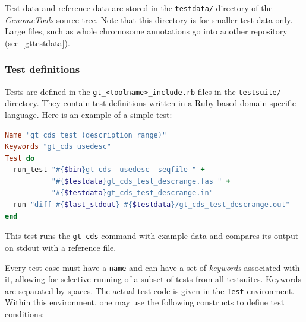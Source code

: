 \documentclass[11pt,final]{article}
\newcommand{\keyword}[1]{\lstinline{#1}}
\newcommand{\Gt}[0]{\emph{GenomeTools}\xspace}
\begin{document}
Test data and reference data are stored in the \keyword{testdata/} directory
of the \Gt source tree. Note that this directory is for smaller test data only.
Large files, such as whole chromosome annotations go into another repository
(see~\ref{gttestdata}).

\subsubsection{Test definitions}
\label{testdefinitions}

Tests are defined in the \keyword{gt_<toolname>_include.rb} files in the
\keyword{testsuite/} directory. They contain test definitions written in a
Ruby-based domain specific language. Here is an example of a simple test:

\begin{lstlisting}[language=Ruby]
Name "gt cds test (description range)"
Keywords "gt_cds usedesc"
Test do
  run_test "#{$bin}gt cds -usedesc -seqfile " +
           "#{$testdata}gt_cds_test_descrange.fas " +
           "#{$testdata}gt_cds_test_descrange.in"
  run "diff #{$last_stdout} #{$testdata}/gt_cds_test_descrange.out"
end
\end{lstlisting}%

This test runs the \keyword{gt cds} command with example data and compares its
output on stdout with a reference file.

Every test case must have a \keyword{name} and can have a set of \emph{keywords}
associated with it, allowing for selective running of a subset of tests from
all testsuites. Keywords are separated by spaces.
The actual test code is given in the \keyword{Test} environment.
Within this environment, one may use the following constructs to define test
conditions:
\end{document}
